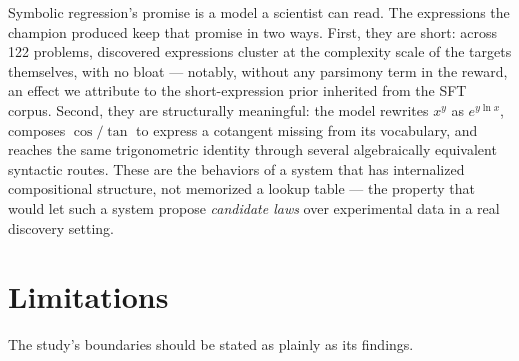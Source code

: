 Symbolic regression's promise is a model a scientist can read. The expressions the champion produced keep that promise in two ways. First, they are short: across 122 problems, discovered expressions cluster at the complexity scale of the targets themselves, with no bloat --- notably, without any parsimony term in the reward, an effect we attribute to the short-expression prior inherited from the SFT corpus. Second, they are structurally meaningful: the model rewrites $x^y$ as $e^{y \ln x}$, composes $\cos/\tan$ to express a cotangent missing from its vocabulary, and reaches the same trigonometric identity through several algebraically equivalent syntactic routes. These are the behaviors of a system that has internalized compositional structure, not memorized a lookup table --- the property that would let such a system propose \emph{candidate laws} over experimental data in a real discovery setting.

\section{Limitations}

The study's boundaries should be stated as plainly as its findings.

